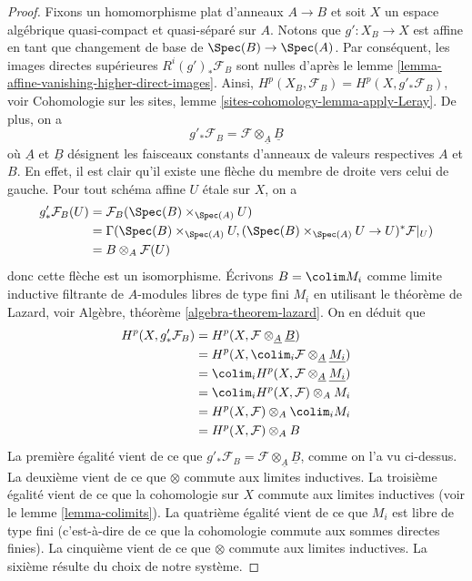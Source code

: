 \begin{proof}
\medskip\noindent
Fixons un homomorphisme plat d'anneaux $A \to B$ et soit $X$ un espace algébrique
quasi-compact et quasi-séparé sur $A$. Notons que $g' : X_B \to X$
est affine en tant que changement de base de $\Spec(B) \to \Spec(A)$. Par conséquent,
les images directes supérieures $R^i(g')_*\mathcal{F}_B$ sont nulles d'après le
lemme \ref{lemma-affine-vanishing-higher-direct-images}.
Ainsi, $H^p(X_B, \mathcal{F}_B) = H^p(X, g'_*\mathcal{F}_B)$, voir
Cohomologie sur les sites, lemme \ref{sites-cohomology-lemma-apply-Leray}.
De plus, on a
$$
g'_*\mathcal{F}_B = \mathcal{F} \otimes_{\underline{A}} \underline{B}
$$
où $\underline{A}$ et $\underline{B}$ désignent les faisceaux constants d'anneaux
de valeurs respectives $A$ et $B$. En effet, il est clair qu'il existe une flèche
du membre de droite vers celui de gauche. Pour tout schéma affine $U$ étale sur $X$, on a
\begin{align*}
g'_*\mathcal{F}_B(U) & = \mathcal{F}_B(\Spec(B) \times_{\Spec(A)} U) \\
& =
\Gamma(\Spec(B) \times_{\Spec(A)} U,
(\Spec(B) \times_{\Spec(A)} U \to U)^*\mathcal{F}|_U) \\
& =
B \otimes_A \mathcal{F}(U)
\end{align*}
donc cette flèche est un isomorphisme. Écrivons $B = \colim M_i$ comme limite
inductive filtrante de $A$-modules libres de type fini $M_i$ en utilisant le théorème de Lazard, voir
Algèbre, théorème \ref{algebra-theorem-lazard}.
On en déduit que
\begin{align*}
H^p(X, g'_*\mathcal{F}_B) &
= H^p(X, \mathcal{F} \otimes_{\underline{A}} \underline{B}) \\
& = H^p(X, \colim_i \mathcal{F} \otimes_{\underline{A}} \underline{M_i}) \\
& = \colim_i H^p(X, \mathcal{F} \otimes_{\underline{A}} \underline{M_i}) \\
& = \colim_i H^p(X, \mathcal{F}) \otimes_A M_i \\
& = H^p(X, \mathcal{F}) \otimes_A \colim_i M_i \\
& = H^p(X, \mathcal{F}) \otimes_A B
\end{align*}
La première égalité vient de ce que
$g'_*\mathcal{F}_B = \mathcal{F} \otimes_{\underline{A}} \underline{B}$,
comme on l'a vu ci-dessus.
La deuxième vient de ce que $\otimes$ commute aux limites inductives.
La troisième égalité vient de ce que la cohomologie sur $X$ commute aux
limites inductives (voir le
lemme \ref{lemma-colimits}).
La quatrième égalité vient de ce que $M_i$ est libre de type fini (c'est-à-dire de ce que la cohomologie
commute aux sommes directes finies).
La cinquième vient de ce que $\otimes$ commute aux limites inductives.
La sixième résulte du choix de notre système.
\end{proof}

